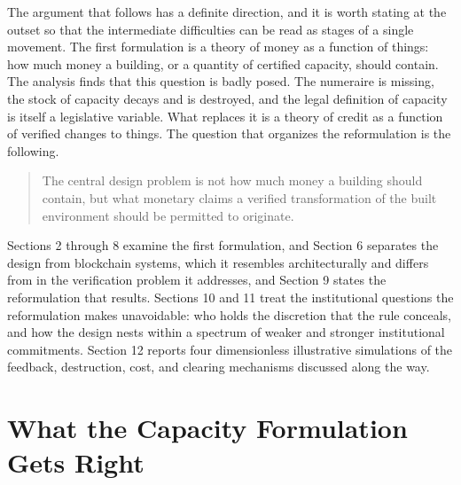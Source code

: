 \documentclass[11pt]{article}
\theoremstyle{definition}
\begin{document}
The argument that follows has a definite direction, and it is worth stating at the outset so that the intermediate difficulties can be read as stages of a single movement. The first formulation is a theory of money as a function of things: how much money a building, or a quantity of certified capacity, should contain. The analysis finds that this question is badly posed. The numeraire is missing, the stock of capacity decays and is destroyed, and the legal definition of capacity is itself a legislative variable. What replaces it is a theory of credit as a function of verified changes to things. The question that organizes the reformulation is the following.

\begin{quote}
The central design problem is not how much money a building should contain, but what monetary claims a verified transformation of the built environment should be permitted to originate.
\end{quote}

\noindent Sections 2 through 8 examine the first formulation, and Section 6 separates the design from blockchain systems, which it resembles architecturally and differs from in the verification problem it addresses, and Section 9 states the reformulation that results. Sections 10 and 11 treat the institutional questions the reformulation makes unavoidable: who holds the discretion that the rule conceals, and how the design nests within a spectrum of weaker and stronger institutional commitments. Section 12 reports four dimensionless illustrative simulations of the feedback, destruction, cost, and clearing mechanisms discussed along the way.

\section{What the Capacity Formulation Gets Right}
\end{document}

